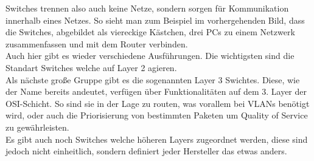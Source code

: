 \documentclass[11pt,a4paper]{report}
\begin{document}
Switches trennen also auch keine Netze, sondern sorgen für Kommunikation innerhalb eines Netzes. So sieht man zum Beispiel im vorhergehenden Bild, dass die Switches, abgebildet als viereckige Kästchen, drei PCs zu einem Netzwerk zusammenfassen und mit dem Router verbinden.\\


Auch hier gibt es wieder verschiedene Ausführungen. Die wichtigsten sind die Standart Switches welche auf Layer 2 agieren.\\
Als nächste große Gruppe gibt es die sogenannten Layer 3 Swichtes. Diese, wie der Name bereits andeutet, verfügen über Funktionalitäten auf dem 3. Layer der OSI-Schicht. So sind sie in der Lage zu routen, was vorallem bei VLANs benötigt wird, oder auch die Priorisierung von bestimmten Paketen um Quality of Service zu gewährleisten.\\
Es gibt auch noch Switches welche höheren Layers zugeordnet werden, diese sind jedoch nicht einheitlich, sondern definiert jeder Hersteller das etwas anders.
\end{document}
